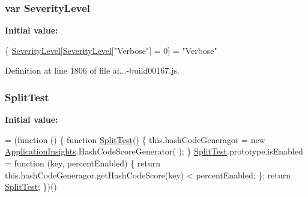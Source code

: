 \subsubsection[{\texorpdfstring{Severity\+Level}{SeverityLevel}}]{\setlength{\rightskip}{0pt plus 5cm}var Severity\+Level}\hypertarget{obj_2_release_2_package_2_package_tmp_2_scripts_2ai_80_822_89-build00167_8js_a09d2f6aeadb27dbc0a4d4b8964cba33c}{}\label{obj_2_release_2_package_2_package_tmp_2_scripts_2ai_80_822_89-build00167_8js_a09d2f6aeadb27dbc0a4d4b8964cba33c}
{\bfseries Initial value\+:}
\begin{DoxyCode}
\{
        \hyperlink{obj_2_release_2_package_2_package_tmp_2_scripts_2ai_80_822_89-build00167_8js_a09d2f6aeadb27dbc0a4d4b8964cba33c}{SeverityLevel}[\hyperlink{obj_2_release_2_package_2_package_tmp_2_scripts_2ai_80_822_89-build00167_8js_a09d2f6aeadb27dbc0a4d4b8964cba33c}{SeverityLevel}[\textcolor{stringliteral}{"Verbose"}] = 0] = \textcolor{stringliteral}{"Verbose"}
\end{DoxyCode}


Definition at line 1806 of file ai...-\/build00167.\+js.

\subsubsection[{\texorpdfstring{Split\+Test}{SplitTest}}]{ Split\+Test}\hypertarget{obj_2_release_2_package_2_package_tmp_2_scripts_2ai_80_822_89-build00167_8js_a27b27014c3d42240b906d918dc25c813}{}\label{obj_2_release_2_package_2_package_tmp_2_scripts_2ai_80_822_89-build00167_8js_a27b27014c3d42240b906d918dc25c813}
{\bfseries Initial value\+:}
\begin{DoxyCode}
= (\textcolor{keyword}{function} () \{
            \textcolor{keyword}{function} \hyperlink{obj_2_release_2_package_2_package_tmp_2_scripts_2ai_80_822_89-build00167_8js_a27b27014c3d42240b906d918dc25c813}{SplitTest}() \{
                this.hashCodeGeneragor = \textcolor{keyword}{new} \hyperlink{obj_2_release_2_package_2_package_tmp_2_scripts_2ai_80_822_89-build00167_8js_aa415ef4f8cdd699689ef4b61db7656d8}{ApplicationInsights}.HashCodeScoreGenerator(
      );
            \}
            \hyperlink{obj_2_release_2_package_2_package_tmp_2_scripts_2ai_80_822_89-build00167_8js_a27b27014c3d42240b906d918dc25c813}{SplitTest}.prototype.isEnabled = \textcolor{keyword}{function} (key, percentEnabled) \{
                \textcolor{keywordflow}{return} this.hashCodeGeneragor.getHashCodeScore(key) < percentEnabled;
            \};
            \textcolor{keywordflow}{return} \hyperlink{obj_2_release_2_package_2_package_tmp_2_scripts_2ai_80_822_89-build00167_8js_a27b27014c3d42240b906d918dc25c813}{SplitTest};
        \})()
\end{DoxyCode}


